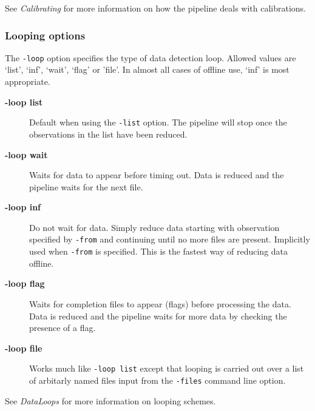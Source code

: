 \documentclass[twoside,11pt]{article}
\renewcommand{\_}{\texttt{\symbol{95}}}
\begin{document}
See \emph{Calibrating} for more information on how the pipeline deals
with calibrations.

\subsubsection*{Looping options\label{oracdr_Looping_options}}


The \texttt{-loop} option specifies the type of data detection loop. Allowed
values are `list', `inf', `wait', `flag' or 'file'. In almost all cases of
offline use, `inf' is most appropriate.

\begin{description}

\item[\textbf{-loop list}] \mbox{}

Default when using the \texttt{-list} option. The pipeline will stop
once the observations in the list have been reduced.


\item[\textbf{-loop wait}] \mbox{}

Waits for data to appear before timing out. Data is reduced and the pipeline
waits for the next file.


\item[\textbf{-loop inf}] \mbox{}

Do not wait for data. Simply reduce data starting with observation
specified by \texttt{-from} and continuing until no more files are present.
Implicitly used when \texttt{-from} is specified. This is the fastest way
of reducing data offline.


\item[\textbf{-loop flag}] \mbox{}

Waits for completion files to appear (flags) before processing the data.
Data is reduced and the pipeline waits for more data by checking the
presence of a flag.


\item[\textbf{-loop file}] \mbox{}

Works much like \texttt{-loop list} except that looping is carried out over a
list of arbitarly named files input from the \texttt{-files} command line option.

\end{description}


See \emph{DataLoops} for more
information on looping schemes.
\end{document}
